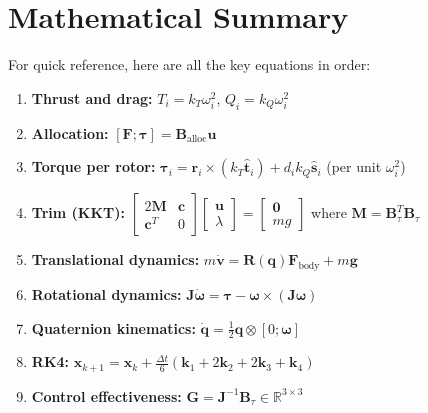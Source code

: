 \documentclass[12pt, a4paper]{article}
\newcommand{\R}{\mathbb{R}}
\newcommand{\bx}{\bm{x}}
\newcommand{\bu}{\bm{u}}
\newcommand{\bq}{\bm{q}}
\newcommand{\bomega}{\bm{\omega}}
\newcommand{\btau}{\bm{\tau}}
\newcommand{\bF}{\bm{F}}
\newcommand{\bJ}{\bm{J}}
\newcommand{\bB}{\bm{B}}
\begin{document}
\section{Mathematical Summary}
\label{sec:math_summary}

For quick reference, here are all the key equations in order:

\begin{enumerate}
    \item \textbf{Thrust and drag:} $T_i = k_T \omega_i^2$, \; $Q_i = k_Q \omega_i^2$

    \item \textbf{Allocation:} $[\bF; \btau] = \bB_{\text{alloc}} \bu$

    \item \textbf{Torque per rotor:} $\btau_i = \bm{r}_i \times (k_T \hat{\bm{t}}_i) + d_i k_Q \hat{\bm{s}}_i$ \; (per unit $\omega_i^2$)

    \item \textbf{Trim (KKT):}
    $\begin{bmatrix} 2\bm{M} & \bm{c} \\ \bm{c}^T & 0 \end{bmatrix}
    \begin{bmatrix} \bu \\ \lambda \end{bmatrix}
    = \begin{bmatrix} \bm{0} \\ mg \end{bmatrix}$
    where $\bm{M} = \bB_\tau^T \bB_\tau$

    \item \textbf{Translational dynamics:} $m\dot{\bm{v}} = \bm{R}(\bq) \bF_{\text{body}} + m\bm{g}$

    \item \textbf{Rotational dynamics:} $\bJ\dot{\bomega} = \btau - \bomega \times (\bJ\bomega)$

    \item \textbf{Quaternion kinematics:} $\dot{\bq} = \frac{1}{2}\bq \otimes [0; \bomega]$

    \item \textbf{RK4:} $\bx_{k+1} = \bx_k + \frac{\Delta t}{6}(\bm{k}_1 + 2\bm{k}_2 + 2\bm{k}_3 + \bm{k}_4)$

    \item \textbf{Control effectiveness:} $\bm{G} = \bJ^{-1}\bB_\tau \in \R^{3 \times 3}$


\end{enumerate}
\end{document}
